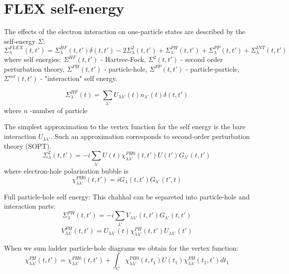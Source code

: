 \section{FLEX self-energy}
\label{section:FLEX_self_energy}
The effects of the electron interaction on one-particle states are described by the self-energy $\Sigma$:
\begin{equation}
\Sigma_{\lambda}^{FLEX}(t,t')= \Sigma_{\lambda}^{HF}(t,t')\delta(t,t')-2\Sigma_{\lambda}^{2}(t,t') + \Sigma_{\lambda}^{PH}(t,t') + \Sigma_{\lambda}^{PP}(t,t')+ \Sigma_{\lambda}^{INT}(t,t')
\end{equation}
where self energies: $\Sigma^{HF}(t,t')$ - Hartree-Fock, $\Sigma^{2}(t,t')$ - second order perturbation theory, $\Sigma^{PH}(t,t')$ - particle-hole, $\Sigma^{PP}(t,t')$ - particle-particle, $\Sigma^{int}(t,t')$ - "interaction" self energy.


\begin{equation}
\Sigma_{\lambda}^{HF}(t)=\sum_{\lambda'}U_{\lambda \lambda'}(t)n_{\lambda'}(t)\delta(t,t')
\end{equation}
where $n$ -number of particle

The simplest approximation to the vertex function for the self energy is the bare interaction $U_{\lambda \lambda'}$. Such
an approximation corresponds to second-order perturbation theory (SOPT).
\begin{equation}
\Sigma_{\lambda}^{2}(t,t')=-i\sum_{\lambda'}U(t)\chi_{\lambda \lambda'}^{PH0}(t,t')U(t')G_{\lambda'}(t,t')
\end{equation}
where electron-hole polarisation bubble is
\begin{equation}
\chi_{\lambda \lambda'}^{PH0}(t,t')=iG_{\lambda}(t,t')G_{\lambda'}(t',t)
\end{equation}

Full particle-hole self energy:
This chahhal can be separeted into particle-hole and interaction parts:
\begin{equation}
\Sigma_{\lambda}^{PH}(t,t')=-i\sum_{\lambda'}V_{\lambda \lambda'}(t,t')G_{\lambda'}(t,t')
\end{equation}
\begin{equation}
V_{\lambda \lambda'}^{PH}(t,t')=U_{\lambda \lambda'}(t) \chi_{\lambda \lambda'}^{PH}(t,t')U_{\lambda \lambda'}(t')
\end{equation}

When we sum ladder particle-hole diagrams we obtain for the vertex function:
\begin{equation}
\chi_{\lambda \lambda'}^{PH}(t,t')=\chi_{\lambda \lambda'}^{PH0}(t,t')+\int_C{\chi_{\lambda \lambda'}^{PH0}(t,t_1)U(t_1)\chi_{\lambda \lambda'}^{PH}(t_1,t') dt_1}
\end{equation}

